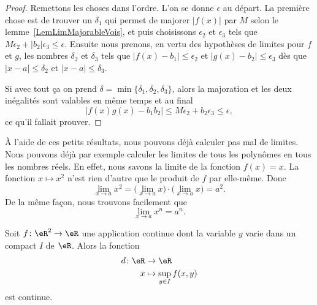 \begin{proof}
    Remettons les choses dans l'ordre. L'on se donne $\epsilon$ au départ. La première chose est de trouver un $\delta_1$ qui permet de majorer $|f(x)|$ par $M$ selon le lemme~\ref{LemLimMajorableVois}, et puis choisissons $\epsilon_2$ et $\epsilon_3$ tels que $M\epsilon_2+| b_2 |\epsilon_3\leq\epsilon$. Ensuite nous prenons, en vertu des hypothèses de limites pour $f$ et $g$, les nombres $\delta_2$ et $\delta_3$ tels que $| f(x)-b_1 |\leq \epsilon_2$ et $| g(x)-b_2 |\leq \epsilon_3$ dès que $| x-a |\leq \delta_2$ et $| x-a |\leq \delta_3$.

    Si avec tout ça on prend $\delta=\min\{ \delta_1,\delta_2,\delta_3 \}$, alors la majoration et les deux inégalités sont valables en même temps et au final
    \[
      | f(x)g(x)-b_1b_2 |\leq M\epsilon_2+b_2\epsilon_3\leq \epsilon,
    \]
    ce qu'il fallait prouver.

\end{proof}

À l'aide de ces petits résultats, nous pouvons déjà calculer pas mal de limites. Nous pouvons déjà par exemple calculer les limites de tous les polynômes en tous les nombres réels. En effet, nous savons la limite de la fonction $f(x)=x$. La fonction $x\mapsto x^2$ n'est rien d'autre que le produit de $f$ par elle-même. Donc
\[
  \lim_{x\to a}x^2=\big( \lim_{x\to a}x\big)\cdot\big( \lim_{x\to a}x \big)=a^2.
\]
De la même façon, nous trouvons facilement que
\begin{equation}
 \lim_{x\to a}x^n=a^n.
\end{equation}

\begin{proposition}      \label{PROPooWXBAooAEweSF}
    Soit \( f\colon \eR^2\to \eR\) une application continue dont la variable \( y\) varie dans un compact \( I\) de \( \eR\). Alors la fonction
    \begin{equation}
        \begin{aligned}
            d\colon \eR&\to \eR \\
            x&\mapsto \sup_{y\in I} f(x,y)
        \end{aligned}
    \end{equation}
    est continue.
\end{proposition}

